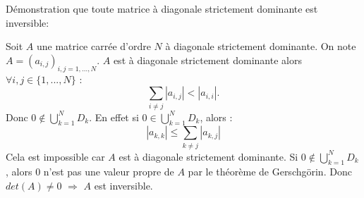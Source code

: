 \documentclass[a4paper,11pt]{article}
\begin{document}
	Démonstration que toute matrice à diagonale strictement dominante est inversible:

	Soit $A$ une matrice carrée d'ordre $N$ à diagonale strictement dominante. On note $A = (a_{i,j})_{i,j=1,...,N}$.
	$A$ est à diagonale strictement dominante alors $\forall i, j \in \{1, ..., N\}$ :
	\begin{equation*}
		\sum\limits_{i \neq j} |a_{i, j}| < |a_{i, i}|.
	\end{equation*}
	Donc $0 \notin \bigcup\limits_{k=1}^{N} D_{k}$. En effet si $0 \in \bigcup\limits_{k=1}^{N} D_{k}$, alors :
	\begin{equation*}
		|a_{k, k}| \leqslant \sum\limits_{k \neq j} |a_{k, j}|
	\end{equation*}
	Cela est impossible car $A$ est à diagonale strictement dominante.
	Si $0 \notin \bigcup\limits_{k=1}^{N} D_{k}$, alors $0$ n'est pas une valeur propre de $A$ par le théorème de Gerschgörin.
	Donc $det(A) \neq 0$ $\Longrightarrow$ $A$ est inversible.
\end{document}
